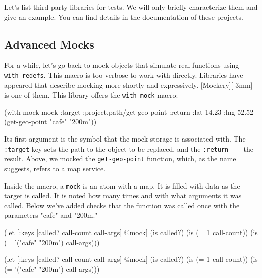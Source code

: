 Let's list third-party libraries for tests. We will only briefly characterize them and give an example. You can find details in the documentation of these projects.

\subsection{Advanced Mocks}


For a while, let's go back to mock objects that simulate real functions using \verb|with-redefs|. This macro is too verbose to work with directly. Libraries have appeared that describe mocking more shortly and expressively.
[Mockery][-3mm] is one of them. This library offers the \verb|with-mock| macro:

\begin{english}
  \begin{clojure}
(with-mock mock
  {:target :project.path/get-geo-point
   :return {:lat 14.23 :lng 52.52}}
  (get-geo-point "cafe" "200m"))
  \end{clojure}
\end{english}

Its first argument is the symbol that the mock storage is associated with. The \verb|:target| key sets the path to the object to be replaced, and the \verb|:return| ~--- the result. Above, we mocked the \verb|get-geo-point| function, which, as the name suggests, refers to a map service.

Inside the macro, a \verb|mock| is an atom with a map. It is filled with data as the target is called.  It is noted how many times and with what arguments it was called. Below we've added checks that the function was called once with the parameters "cafe" and "200m."

\ifnarrow

\begin{english}
  \begin{clojure}
(let [{:keys [called?
              call-count
              call-args]} @mock]
  (is called?)
  (is (= 1 call-count))
  (is (= '("cafe" "200m") call-args)))
  \end{clojure}
\end{english}

\else

\begin{english}
  \begin{clojure}
(let [{:keys [called? call-count call-args]} @mock]
  (is called?)
  (is (= 1 call-count))
  (is (= '("cafe" "200m") call-args)))
  \end{clojure}
\end{english}

